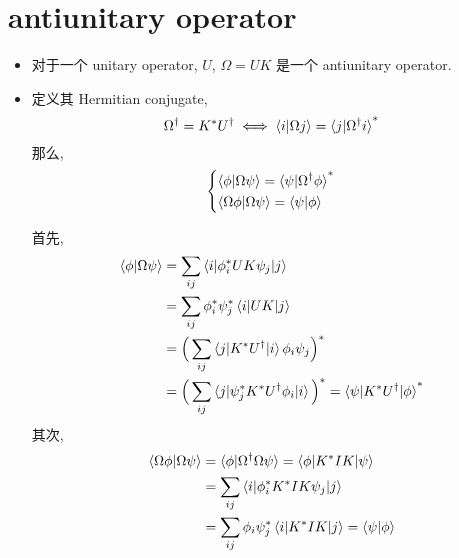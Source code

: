 \section{antiunitary operator}
\begin{itemize}
	\item 对于一个 unitary operator, $U$, $\Omega = U K$ 是一个 antiunitary operator.
	
	\item 定义其 Hermitian conjugate,
	\begin{equation}
		\Omega^\dag = K^* U^\dag \iff \braket{i | \Omega j} = \braket{j | \Omega^\dag i}^*
	\end{equation}
	那么,
	\begin{equation}
		\begin{dcases}
			\braket{\phi | \Omega \psi} = \braket{\psi | \Omega^\dag \phi}^* \\
			\braket{\Omega \phi | \Omega \psi} = \braket{\psi | \phi}
		\end{dcases}
	\end{equation}
	
	\begin{tcolorbox}[title=proof:]
		首先,
		\begin{align}
			\braket{\phi | \Omega \psi} &= \sum_{i j} \braket{i | \phi^*_i U K \psi_j | j} \notag \\
			&= \sum_{i j} \phi^*_i \psi^*_j \braket{i | U K | j} \notag \\
			&= \Big( \sum_{i j} \braket{j | K^* U^\dag | i} \phi_i \psi_j \Big)^* \notag \\
			&= \Big( \sum_{i j} \braket{j | \psi^*_j K^* U^\dag \phi_i | i} \Big)^* = \braket{\psi | K^* U^\dag | \phi}^*
		\end{align}
		其次,
		\begin{align}
			\braket{\Omega \phi | \Omega \psi} &= \braket{\phi | \Omega^\dag \Omega \psi} = \braket{\phi | K^* I K | \psi} \notag \\
			&= \sum_{i j} \braket{i | \phi^*_i K^* I K \psi_j | j} \notag \\
			&= \sum_{i j} \phi_i \psi^*_j \braket{i | K^* I K | j} = \braket{\psi | \phi}
		\end{align}
	\end{tcolorbox}
\end{itemize}
